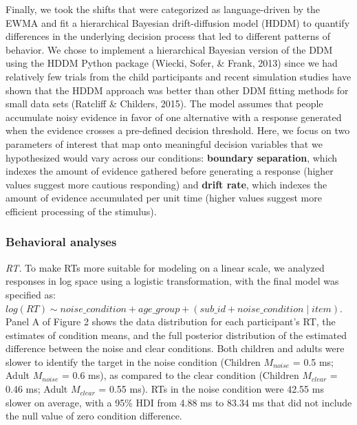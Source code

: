 \documentclass[10pt, letterpaper]{article}
\begin{document}
Finally, we took the shifts that were categorized as language-driven by
the EWMA and fit a hierarchical Bayesian drift-diffusion model (HDDM) to
quantify differences in the underlying decision process that led to
different patterns of behavior. We chose to implement a hierarchical
Bayesian version of the DDM using the HDDM Python package (Wiecki,
Sofer, \& Frank, 2013) since we had relatively few trials from the child
participants and recent simulation studies have shown that the HDDM
approach was better than other DDM fitting methods for small data sets
(Ratcliff \& Childers, 2015). The model assumes that people accumulate
noisy evidence in favor of one alternative with a response generated
when the evidence crosses a pre-defined decision threshold. Here, we
focus on two parameters of interest that map onto meaningful decision
variables that we hypothesized would vary across our conditions:
\textbf{boundary separation}, which indexes the amount of evidence
gathered before generating a response (higher values suggest more
cautious responding) and \textbf{drift rate}, which indexes the amount
of evidence accumulated per unit time (higher values suggest more
efficient processing of the stimulus).

\subsubsection{Behavioral analyses}\label{behavioral-analyses}

\emph{RT.} To make RTs more suitable for modeling on a linear scale, we
analyzed responses in log space using a logistic transformation, with
the final model was specified as:
\texttt{$log(RT) \sim noise\_condition + age\_group + (sub\_id + noise\_condition \mid item)$}.
Panel A of Figure 2 shows the data distribution for each participant's
RT, the estimates of condition means, and the full posterior
distribution of the estimated difference between the noise and clear
conditions. Both children and adults were slower to identify the target
in the noise condition (Children \(M_{noise}\) = 0.5 ms; Adult
\(M_{noise}\) = 0.6 ms), as compared to the clear condition (Children
\(M_{clear}\) = 0.46 ms; Adult \(M_{clear}\) = 0.55 ms). RTs in the
noise condition were 42.55 ms slower on average, with a 95\% HDI from
4.88 ms to 83.34 ms that did not include the null value of zero
condition difference.
\end{document}
